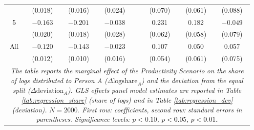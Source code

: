 \documentclass[smallcondensed]{svjour3}
\begin{document}
\begin{table}[ht]
{\begin{tabular}{cccccccc}
                            &  (0.018)                  &  (0.016)                   &  (0.024)                         &   &  (0.070)                  &  (0.061)                   &  (0.088)                         \\
   5                        & $-0.163$\sym{***}         & $-0.201$\sym{***}          & $-0.038$                         &   &   0.231\sym{***}          &   0.182\sym{***}           & $-0.049$                         \\
                            &  (0.020)                  &  (0.018)                   &  (0.028)                         &   &  (0.062)                  &  (0.058)                   &  (0.079)                         \\\hline
   All                      & $-0.120$\sym{***}         & $-0.143$\sym{***}          & $-0.023$                         &   &   0.107\sym{**}           &   0.050                    &   0.057                          \\
                            &  (0.012)                  &  (0.010)                   &  (0.016)                         &   &  (0.054)                  &  (0.061)                   &  (0.075)                         \\\hline
\multicolumn{8}{p{12cm}}{\footnotesize{\textit{The table reports the marginal effect of the Productivity Scenario on the share of logs distributed to Person A ($\Delta\mbox{logshare}_A$) and the deviation from the equal split ($\Delta\mbox{deviation}_A$). GLS effects panel model estimates are reported in Table \ref{tab:regression_share} (share of logs) and in Table \ref{tab:regression_dev} (deviation). $N=2000$. First row: coefficients, second row: standard errors in parentheses. Significance levels: \sym{*} \(p<0.10\), \sym{**} \(p<0.05\), \sym{***} \(p<0.01\).}}}
\end{tabular}
}
\end{table}
%
\clearpage
%
\end{document}
